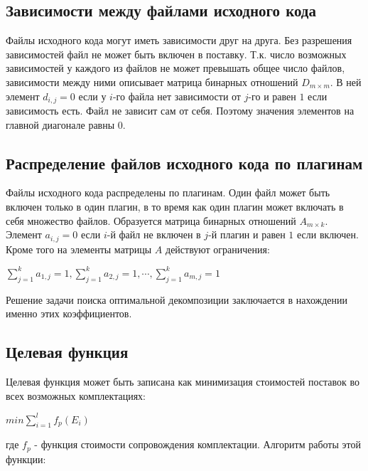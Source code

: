 \subsection*{Зависимости между файлами исходного кода}
Файлы исходного кода могут иметь зависимости друг на друга. Без разрешения зависимостей файл не может быть включен в поставку. Т.к. число возможных зависимостей у каждого из файлов не может превышать общее число файлов, зависимости между ними описывает матрица бинарных отношений $D_{m \times m}$. В ней элемент $d_{i, j} = 0$ если у $i$-го файла нет зависимости от $j$-го и равен $1$ если зависимость есть. Файл не зависит сам от себя. Поэтому значения элементов на главной диагонале равны $0$.

\subsection*{Распределение файлов исходного кода по плагинам}
Файлы исходного кода распределены по плагинам. Один файл может быть включен только в один плагин, в то время как один плагин может включать в себя множество файлов. Образуется матрица бинарных отношений $A_{m \times k}$. Элемент $a_{i, j} = 0$ если $i$-й файл не включен в $j$-й плагин и равен $1$ если включен. Кроме того на элементы матрицы $A$ действуют ограничения:
\begin{center}
  $\displaystyle \sum^{k}_{j = 1}a_{1, j} = 1, \sum^{k}_{j = 1}a_{2, j} = 1, \cdots, \sum^{k}_{j = 1}a_{m, j} = 1$
\end{center}
Решение задачи поиска оптимальной декомпозиции заключается в нахождении именно этих коэффициентов.

\subsection*{Целевая функция}
Целевая функция может быть записана как минимизация стоимостей поставок во всех возможных комплектациях:
\begin{center}
  $\displaystyle min \sum^{l}_{i = 1} f_{p}(E_{i})$
\end{center}

где $f_{p}$ - функция стоимости сопровождения комплектации. Алгоритм работы этой функции:

